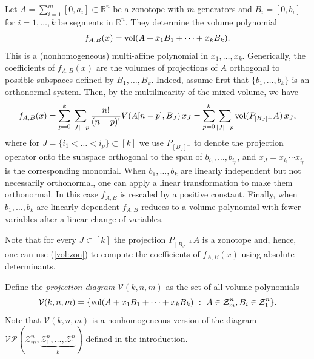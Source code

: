 \documentclass[11pt]{amsart}
\newcommand{\R}{\mathbb R}
\newcommand{\cV}{\mathcal V}
\newcommand{\VP}{\mathcal{VP}}
\newcommand{\Z}{\mathcal Z}
\def\vol{{\rm vol}}
\theoremstyle{definition}
\theoremstyle{remark}
\newcommand{\Det}{\operatorname{Det}}
\begin{document}


Let $A = \sum_{i=1}^{m} [0, a_i]\subset\R^n$ be a zonotope with $m$ generators and 
$B_i=[0,b_i]$ for $i=1,\dots, k$ be segments in $\R^n$. They determine the volume polynomial
$$f_{A,B}(x)=\vol(A+x_1B_1+\dots+x_kB_k).$$ 
This is a (nonhomogeneous) multi-affine polynomial
in $x_1,\dots, x_k$.  Generically, the coefficients of $f_{A,B}(x)$ are the volumes of projections of $A$ orthogonal to possible subspaces defined by $B_1,\dots, B_k$. Indeed, assume first that $\{ b_1,\dots, b_k \}$ %
is an orthonormal system. Then, by the multilinearity of the mixed volume, we have
\begin{align}\label{e:vol-poly}
 f_{A,B}(x)= \sum_{p=0}^k\sum_{|J|=p}\frac{n!}{(n-p)!}V(A[n-p],B_J)\,x_{J}=\sum_{p=0}^k\sum_{|J|=p}\vol(P_{[B_{J}]^\perp}A)\,x_{J},
\end{align}
where for $J=\{i_1<\dots<i_p\}\subset[k]$ we use
$P_{[B_{J}]^\perp}$ to denote the projection operator onto the subspace orthogonal to the span
of $b_{i_1},\dots,b_{i_p}$,  and $x_{J}=x_{i_1}\cdots x_{i_p}$ is the corresponding monomial. 
When $b_1,\dots, b_k$ are linearly independent but not necessarily orthonormal, one can apply a linear transformation to make them orthonormal. In this case $f_{A,B}$ is rescaled by a positive constant. Finally, 
when $b_1,\dots, b_k$ are linearly dependent $f_{A,B}$ reduces to a volume polynomial with fewer variables
after a linear change of variables.

Note that for every $J\subset[k]$ the projection $P_{[B_{J}]^\perp}A$ is a zonotope and, hence, one can 
use (\ref{vol:zon}) to compute the coefficients of $f_{A,B}(x)$ using absolute determinants.

Define the {\it projection diagram}
$\cV(k,n,m)$ as the set of all volume polynomials
$$\cV(k,n,m) = \{\vol(A+x_1B_1+\dots+x_kB_k) \ : \ A\in\Z_m^n, B_i\in\Z_1^n\}.$$
Note that $\cV(k,n,m)$ is a nonhomogeneous version of the diagram $\VP(\Z_m^n,\underbrace{\Z_1^n,\dots, \Z_1^n}_{k})$  
defined in the introduction.
\end{document}
